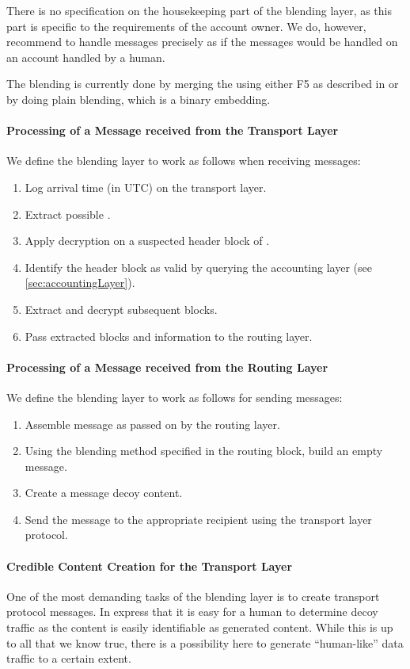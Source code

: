 There is no specification on the housekeeping part of the blending layer, as this part is specific to the requirements of the account owner. We do, however, recommend to handle messages precisely as if the messages would be handled on an account handled by a human.

The blending is currently done by merging the \VortexMessage using either F5 as described in \cite{f5} or by doing plain blending, which is a binary embedding.

\paragraph{Processing of a Message received from the Transport Layer}
We define the blending layer to work as follows when receiving messages:
\begin{enumerate}
	\item Log arrival time (in UTC) on the transport layer.
	\item Extract possible \VortexMessage.
	\item Apply decryption on a suspected header block of \VortexMessage.
	\item Identify the header block as valid by querying the accounting layer (see \ref{sec:accountingLayer}).
	\item Extract and decrypt subsequent blocks.
	\item Pass extracted blocks and information to the routing layer.
\end{enumerate}

\paragraph{Processing of a Message received from the Routing Layer}
We define the blending layer to work as follows for sending messages:
\begin{enumerate}
	\item Assemble message as passed on by the routing layer.
	\item Using the blending method specified in the routing block, build an empty message. 
	\item Create a message decoy content.
	\item Send the message to the appropriate recipient using the transport layer protocol.
\end{enumerate}

\paragraph{Credible Content Creation for the Transport Layer}
One of the most demanding tasks of the blending layer is to create transport protocol messages. In \cite{oakland2013-parrot} \citeauthor{oakland2013-parrot} express that it is easy for a human to determine decoy traffic as the content is easily identifiable as generated content. While this is up to all that we know true, there is a possibility here to generate ``human-like'' data traffic to a certain extent. 

